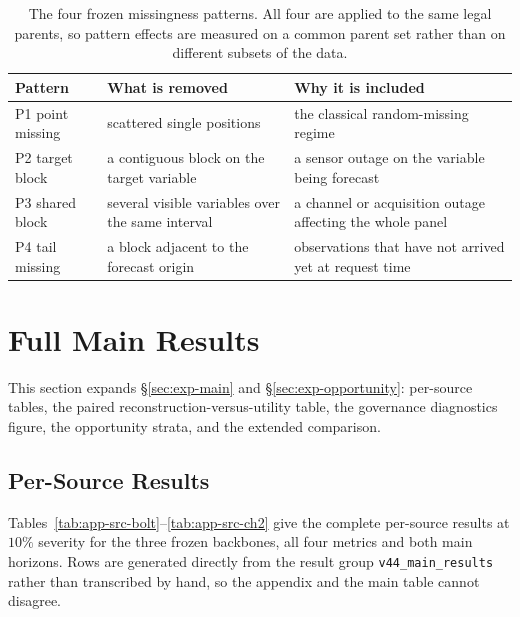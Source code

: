 \documentclass{article}
\begin{document}
\begin{table}[h]
  \caption{The four frozen missingness patterns. All four are applied to the same legal
  parents, so pattern effects are measured on a common parent set rather than on different
  subsets of the data.}
  \label{tab:app-patterns}
  \centering
  \small
  \setlength{\tabcolsep}{4pt}
\begin{tabular}{@{}l p{} p{}@{}}
    \toprule
    Pattern & What is removed & Why it is included \\
    \midrule
    P1 point missing    & scattered single positions & the classical random-missing regime \\
    P2 target block     & a contiguous block on the target variable & a sensor outage on the variable being forecast \\
    P3 shared block     & several visible variables over the same interval & a channel or acquisition outage affecting the whole panel \\
    P4 tail missing     & a block adjacent to the forecast origin & observations that have not arrived yet at request time \\
    \bottomrule
  \end{tabular}
\end{table}

\section{Full Main Results}
\label{app:main-full}
This section expands \S\ref{sec:exp-main} and \S\ref{sec:exp-opportunity}: per-source tables,
the paired reconstruction-versus-utility table, the governance diagnostics figure, the
opportunity strata, and the extended comparison.

\subsection{Per-Source Results}
\label{app:datasets}
Tables~\ref{tab:app-src-bolt}--\ref{tab:app-src-ch2} give the complete per-source results at
$10\%$ severity for the three frozen backbones, all four metrics and both main horizons.
Rows are generated directly from the result group \texttt{v44\_main\_results} rather than
transcribed by hand, so the appendix and the main table cannot disagree.
\end{document}
